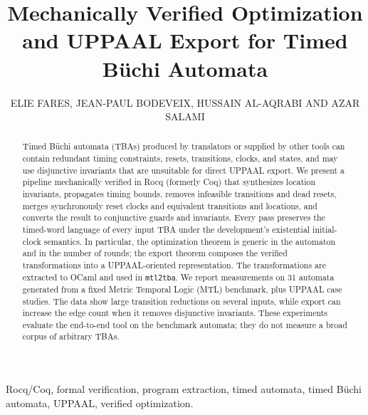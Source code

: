 \documentclass{ieeeaccess}
\begin{document}
\history{}
\doi{}

\title{Mechanically Verified Optimization and UPPAAL Export for Timed B\"uchi Automata}
\author{\uppercase{Elie Fares},
\uppercase{Jean-Paul Bodeveix},
\uppercase{Hussain Al-Aqrabi} AND
\uppercase{Azar Salami}}
\address[1]{Higher Colleges of Technology\\Sharjah, United Arab Emirates\\(e-mail: efares@hct.ac.ae, halaqrabi@hct.ac.ae, asalami@hct.ac.ae)}
\address[2]{IRIT, UPS, Universit\'e de Toulouse, France (e-mail: bodeveix@irit.fr)}

\begin{abstract}
Timed B\"uchi automata (TBAs) produced by translators or supplied by other tools can contain redundant timing constraints, resets, transitions, clocks, and states, and may use disjunctive invariants that are unsuitable for direct UPPAAL export. We present a pipeline mechanically verified in Rocq (formerly Coq) that synthesizes location invariants, propagates timing bounds, removes infeasible transitions and dead resets, merges synchronously reset clocks and equivalent transitions and locations, and converts the result to conjunctive guards and invariants. Every pass preserves the timed-word language of every input TBA under the development's existential initial-clock semantics. In particular, the optimization theorem is generic in the automaton and in the number of rounds; the export theorem composes the verified transformations into a UPPAAL-oriented representation. The transformations are extracted to OCaml and used in \texttt{mtl2tba}. We report measurements on 31 automata generated from a fixed Metric Temporal Logic (MTL) benchmark, plus UPPAAL case studies. The data show large transition reductions on several inputs, while export can increase the edge count when it removes disjunctive invariants. These experiments evaluate the end-to-end tool on the benchmark automata; they do not measure a broad corpus of arbitrary TBAs.
\end{abstract}
\begin{keywords}
Rocq/Coq, formal verification, program extraction, timed automata, timed B\"uchi automata, UPPAAL, verified optimization.
\end{keywords}
\titlepgskip=-15pt
\maketitle
\end{document}
